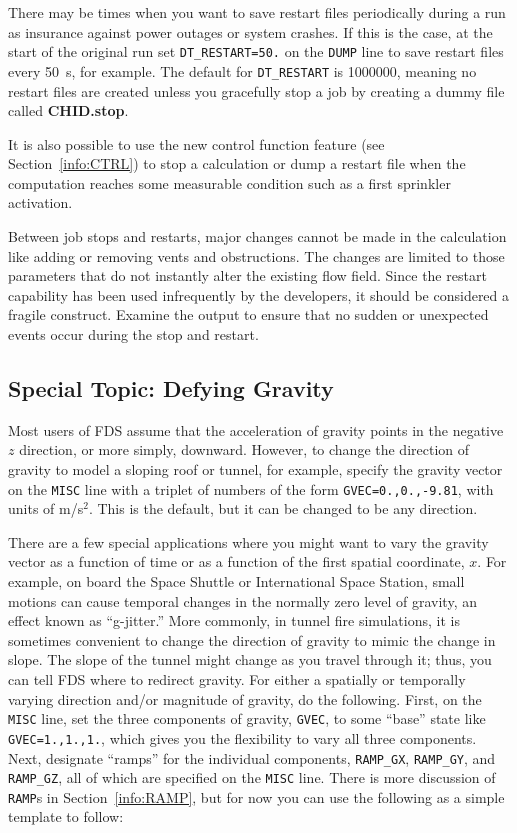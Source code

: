 \documentclass[11pt]{book}
\newcommand{\ct}{\tt\small}
\begin{document}
There may be times when you want to save restart files periodically
during a run as insurance against power outages or system crashes.
If this is the case, at the start of the original run
set {\ct DT\_RESTART=50.} on the {\ct DUMP} line to save restart files
every 50~s, for example.
The default for {\ct DT\_RESTART} is 1000000, meaning no restart files are
created unless you gracefully stop a job by
creating a dummy file called {\bf CHID.stop}.

It is also possible to use the new control function feature (see Section~\ref{info:CTRL})
to stop a calculation or dump a restart file when the computation reaches
some measurable condition such as a first sprinkler activation.

Between job stops and restarts, major changes cannot be made in the calculation
like adding or removing vents and obstructions. The changes are limited to those parameters that do
not instantly alter the existing flow field. Since the restart
capability has been used infrequently by the developers, it should be considered
a fragile construct. Examine the output
to ensure that no sudden or unexpected events occur during the stop and
restart.


\subsection{Special Topic: Defying Gravity}
\label{info:GVEC}

Most users of FDS assume that the acceleration of gravity points in the negative $z$ direction, or more simply, downward.
However, to change the direction of gravity to model
a sloping roof or tunnel, for example, specify the gravity
vector on the {\ct MISC} line with a triplet of numbers of the form
{\ct GVEC=0.,0.,-9.81},
with units of m/s$^2$. This is the default, but it
can be changed to be any direction.

There are a few special applications where you might want to vary the gravity vector as a function of time
or as a function of the first spatial coordinate, $x$. For example, on board the Space Shuttle or International Space Station, small motions can
cause temporal changes in the normally zero level of gravity, an effect known as ``g-jitter.'' More commonly, in tunnel
fire simulations, it is sometimes convenient to change the direction of gravity to mimic the change in slope. The slope
of the tunnel might change as you travel through it; thus, you can tell FDS where to redirect gravity.
For either a spatially or temporally varying direction and/or magnitude of gravity, do the following. First, on the
{\ct MISC} line, set the three components of gravity, {\ct GVEC}, to some ``base'' state like {\ct GVEC=1.,1.,1.},
which gives you the flexibility to vary all three components. Next, designate ``ramps'' for the individual components, {\ct RAMP\_GX},
{\ct RAMP\_GY}, and {\ct RAMP\_GZ}, all of which are specified on the {\ct MISC} line. There is more discussion of
{\ct RAMP}s in Section~\ref{info:RAMP}, but for now you can use the following as a simple template to follow:
\end{document}
